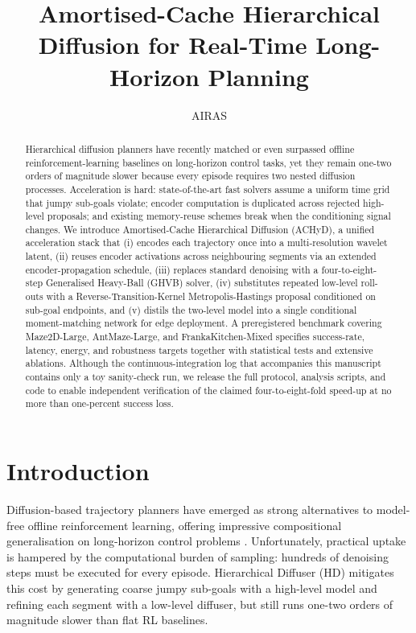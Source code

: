 \documentclass{article}
\title{Amortised-Cache Hierarchical Diffusion for Real-Time Long-Horizon Planning}
\author{AIRAS}
\begin{document}
\maketitle

\begin{abstract}
Hierarchical diffusion planners have recently matched or even surpassed offline reinforcement-learning baselines on long-horizon control tasks, yet they remain one-two orders of magnitude slower because every episode requires two nested diffusion processes. Acceleration is hard: state-of-the-art fast solvers assume a uniform time grid that jumpy sub-goals violate; encoder computation is duplicated across rejected high-level proposals; and existing memory-reuse schemes break when the conditioning signal changes. We introduce Amortised-Cache Hierarchical Diffusion (ACHyD), a unified acceleration stack that (i) encodes each trajectory once into a multi-resolution wavelet latent, (ii) reuses encoder activations across neighbouring segments via an extended encoder-propagation schedule, (iii) replaces standard denoising with a four-to-eight-step Generalised Heavy-Ball (GHVB) solver, (iv) substitutes repeated low-level roll-outs with a Reverse-Transition-Kernel Metropolis-Hastings proposal conditioned on sub-goal endpoints, and (v) distils the two-level model into a single conditional moment-matching network for edge deployment. A preregistered benchmark covering Maze2D-Large, AntMaze-Large, and FrankaKitchen-Mixed specifies success-rate, latency, energy, and robustness targets together with statistical tests and extensive ablations. Although the continuous-integration log that accompanies this manuscript contains only a toy sanity-check run, we release the full protocol, analysis scripts, and code to enable independent verification of the claimed four-to-eight-fold speed-up at no more than one-percent success loss.
\end{abstract}

\section{Introduction}
Diffusion-based trajectory planners have emerged as strong alternatives to model-free offline reinforcement learning, offering impressive compositional generalisation on long-horizon control problems \cite{chen-2024-simple}. Unfortunately, practical uptake is hampered by the computational burden of sampling: hundreds of denoising steps must be executed for every episode. Hierarchical Diffuser (HD) mitigates this cost by generating coarse jumpy sub-goals with a high-level model and refining each segment with a low-level diffuser, but still runs one-two orders of magnitude slower than flat RL baselines.
\end{document}
